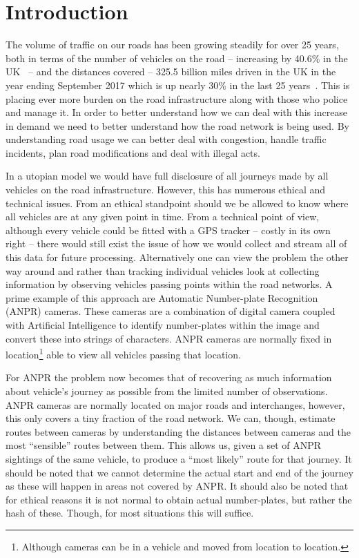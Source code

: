 \section{Introduction}

The volume of traffic on our roads has been growing steadily for over 25 years, both in terms of the number of vehicles on the road -- increasing by 40.6\% in the UK~\cite{noVehiocles} -- and the distances covered -- 325.5 billion miles driven in the UK in the year ending September 2017 which is up nearly 30\% in the last 25 years~\cite{distance}. This is placing ever more burden on the road infrastructure along with those who police and manage it. In order to better understand how we can deal with this increase in demand we need to better understand how the road network is being used. By understanding road usage we can better deal with congestion, handle traffic incidents, plan road modifications and deal with illegal acts.

In a utopian model we would have full disclosure of all journeys made by all vehicles on the road infrastructure. However, this has numerous ethical and technical issues. From an ethical standpoint should we be allowed to know where all vehicles are at any given point in time. From a technical point of view, although every vehicle could be fitted with a GPS tracker -- costly in its own right -- there would still exist the issue of how we would collect and stream all of this data for future processing. Alternatively one can view the problem the other way around and rather than tracking individual vehicles look at collecting information by observing vehicles passing points within the road networks. A prime example of this approach are Automatic Number-plate Recognition (ANPR) cameras. These cameras are a combination of digital camera coupled with Artificial Intelligence to identify number-plates within the image and convert these into strings of characters. ANPR cameras are normally fixed in location\footnote{Although cameras can be in a vehicle and moved from location to location.} able to view all vehicles passing that location.

For ANPR the problem now becomes that of recovering as much information about vehicle's journey as possible from the limited number of observations. ANPR cameras are normally located on major roads and interchanges, however, this only covers a tiny fraction of the road network. We can, though, estimate routes between cameras by understanding the distances between cameras and the most ``sensible'' routes between them. This allows us, given a set of ANPR sightings of the same vehicle, to produce a ``most likely'' route for that journey. It should be noted that we cannot determine the actual start and end of the journey as these will happen in areas not covered by ANPR. It should also be noted that for ethical reasons it is not normal to obtain actual number-plates, but rather the hash of these. Though, for most situations this will suffice.

